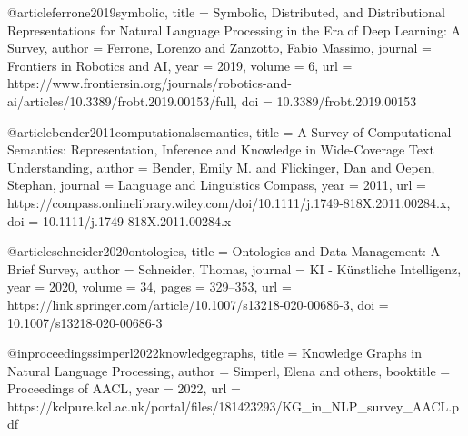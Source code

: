 @article{ferrone2019symbolic,
  title   = {Symbolic, Distributed, and Distributional Representations for Natural Language Processing in the Era of Deep Learning: A Survey},
  author  = {Ferrone, Lorenzo and Zanzotto, Fabio Massimo},
  journal = {Frontiers in Robotics and AI},
  year    = {2019},
  volume  = {6},
  url     = {https://www.frontiersin.org/journals/robotics-and-ai/articles/10.3389/frobt.2019.00153/full},
  doi     = {10.3389/frobt.2019.00153}
}

@article{bender2011computationalsemantics,
  title   = {A Survey of Computational Semantics: Representation, Inference and Knowledge in Wide-Coverage Text Understanding},
  author  = {Bender, Emily M. and Flickinger, Dan and Oepen, Stephan},
  journal = {Language and Linguistics Compass},
  year    = {2011},
  url     = {https://compass.onlinelibrary.wiley.com/doi/10.1111/j.1749-818X.2011.00284.x},
  doi     = {10.1111/j.1749-818X.2011.00284.x}
}

@article{schneider2020ontologies,
  title   = {Ontologies and Data Management: A Brief Survey},
  author  = {Schneider, Thomas},
  journal = {KI - K{\"u}nstliche Intelligenz},
  year    = {2020},
  volume  = {34},
  pages   = {329--353},
  url     = {https://link.springer.com/article/10.1007/s13218-020-00686-3},
  doi     = {10.1007/s13218-020-00686-3}
}

@inproceedings{simperl2022knowledgegraphs,
  title     = {Knowledge Graphs in Natural Language Processing},
  author    = {Simperl, Elena and others},
  booktitle = {Proceedings of AACL},
  year      = {2022},
  url       = {https://kclpure.kcl.ac.uk/portal/files/181423293/KG_in_NLP_survey_AACL.pdf}
}


